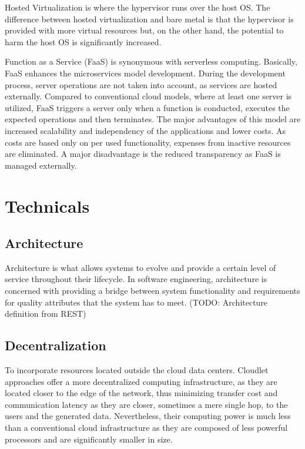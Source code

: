 \documentclass{ieeeaccess}
\begin{document}
Hosted Virtualization is where the hypervisor runs over the host OS. The difference between hosted virtualization and bare metal is that the hypervisor is provided with more virtual resources but, on the other hand, the potential to harm the host OS is significantly increased.

Function as a Service (FaaS) is synonymous with serverless computing. Basically, FaaS enhances the microservices model development. During the development process, server operations are not taken into account, as services are hosted externally. Compared to conventional cloud models, where at least one server is utilized, FaaS triggers a server only when a function is conducted, executes the expected operations and then terminates. The major advantages of this model are increased scalability and independency of the applications and lower costs. As costs are based only on per used functionality, expenses from inactive resources are eliminated. A major disadvantage is the reduced transparency as FaaS is managed externally.

\section{Technicals}

\subsection{Architecture}

Architecture is what allows systems to evolve and provide a certain level of service throughout their lifecycle. In software engineering, architecture is concerned with providing a bridge between system functionality and requirements for quality attributes that the system has to meet. (TODO: Architecture definition from REST)

\subsection{Decentralization}

To incorporate resources located outside the cloud data centers. Cloudlet \cite{cloudlet} approaches offer a more decentralized computing infrastructure, as they are located closer to the edge of the network, thus minimizing transfer cost and communication latency as they are closer, sometimes a mere single hop, to the users and the generated data. Nevertheless, their computing power is much less than a conventional cloud infrastructure as they are composed of less powerful processors and are significantly smaller in size.
\end{document}
